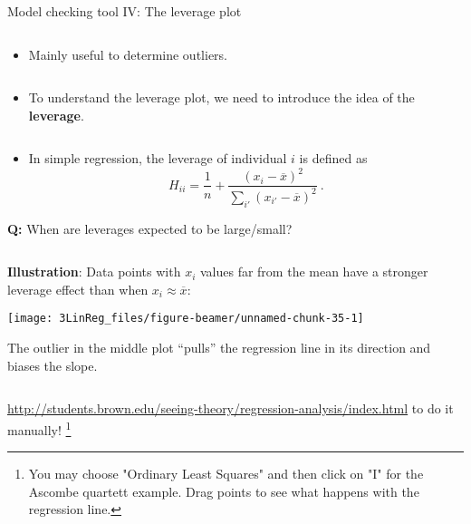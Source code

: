 \documentclass[10pt,ignorenonframetext,]{beamer}
\providecommand{\tightlist}{%
  \setlength{\itemsep}{0pt}\setlength{\parskip}{0pt}}
\begin{document}
\begin{frame}

\begin{block}{Model checking tool IV: The leverage plot}

\(~\)

\begin{itemize}
\tightlist
\item
  Mainly useful to determine outliers.
\end{itemize}

\(~\)

\begin{itemize}
\tightlist
\item
  To understand the leverage plot, we need to introduce the idea of the
  \textbf{leverage}.
\end{itemize}

\(~\)

\begin{itemize}
\tightlist
\item
  In simple regression, the leverage of individual \(i\) is defined as
  \begin{equation}\label{eq:leverage}
  H_{ii} = \frac{1}{n} + \frac{(x_i-\overline{x})^2}{\sum_{i'}(x_{i'}-\overline{x})^2} \ . 
  \end{equation}
\end{itemize}

\vspace{7mm}

\textbf{Q:} When are leverages expected to be large/small?

\(~\)

\end{block}

\end{frame}

\begin{frame}

\textbf{Illustration}: Data points with \(x_i\) values far from the mean
have a stronger leverage effect than when \(x_i\approx \overline{x}\):

\begin{center}\texttt{[image: 3LinReg\_files/figure-beamer/unnamed-chunk-35-1]} \end{center}

The outlier in the middle plot ``pulls'' the regression line in its
direction and biases the slope.

\(~\)

\href{http://students.brown.edu/seeing-theory/regression-analysis/index.html}{http://students.brown.edu/seeing-theory/regression-analysis/index.html}
to do it manually!
\footnote{You may choose "Ordinary Least Squares" and then click on "I" for the Ascombe quartett example. Drag points to see what happens with the regression line.}

\end{frame}
\end{document}

